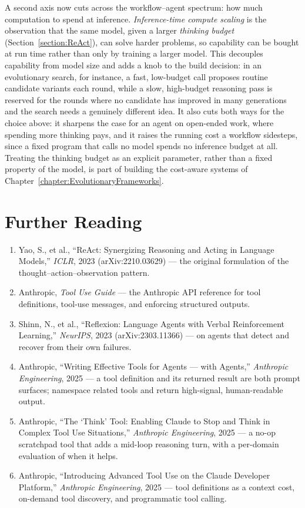 \begin{remark}
A second axis now cuts across the workflow--agent spectrum: how much computation to spend at inference.
\emph{Inference-time compute scaling} is the observation that the same model, given a larger \emph{thinking budget} (Section~\ref{section:ReAct}), can solve harder problems, so capability can be bought at run time rather than only by training a larger model.
This decouples capability from model size and adds a knob to the build decision: in an evolutionary search, for instance, a fast, low-budget call proposes routine candidate variants each round, while a slow, high-budget reasoning pass is reserved for the rounds where no candidate has improved in many generations and the search needs a genuinely different idea.
It also cuts both ways for the choice above: it sharpens the case for an agent on open-ended work, where spending more thinking pays, and it raises the running cost a workflow sidesteps, since a fixed program that calls no model spends no inference budget at all.
Treating the thinking budget as an explicit parameter, rather than a fixed property of the model, is part of building the cost-aware systems of Chapter~\ref{chapter:EvolutionaryFrameworks}.
\end{remark}

\section*{Further Reading}

\begin{small}
\begin{enumerate}
\item Yao, S., et al., ``ReAct: Synergizing Reasoning and Acting in Language Models,'' \emph{ICLR}, 2023 (arXiv:2210.03629) — the original formulation of the thought–action–observation pattern.
\item Anthropic, \emph{Tool Use Guide} — the Anthropic API reference for tool definitions, tool-use messages, and enforcing structured outputs.
\item Shinn, N., et al., ``Reflexion: Language Agents with Verbal Reinforcement Learning,'' \emph{NeurIPS}, 2023 (arXiv:2303.11366) — on agents that detect and recover from their own failures.
\item Anthropic, ``Writing Effective Tools for Agents --- with Agents,'' \emph{Anthropic Engineering}, 2025 — a tool definition and its returned result are both prompt surfaces; namespace related tools and return high-signal, human-readable output.
\item Anthropic, ``The `Think' Tool: Enabling Claude to Stop and Think in Complex Tool Use Situations,'' \emph{Anthropic Engineering}, 2025 — a no-op scratchpad tool that adds a mid-loop reasoning turn, with a per-domain evaluation of when it helps.
\item Anthropic, ``Introducing Advanced Tool Use on the Claude Developer Platform,'' \emph{Anthropic Engineering}, 2025 — tool definitions as a context cost, on-demand tool discovery, and programmatic tool calling.
\end{enumerate}
\end{small}
